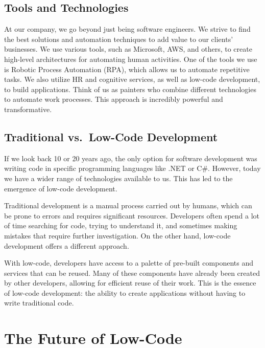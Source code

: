 \subsection{Tools and Technologies}\label{tools-and-technologies}

At our company, we go beyond just being software engineers. We strive to
find the best solutions and automation techniques to add value to our
clients' businesses. We use various tools, such as Microsoft, AWS, and
others, to create high-level architectures for automating human
activities. One of the tools we use is Robotic Process Automation (RPA),
which allows us to automate repetitive tasks. We also utilize HR and
cognitive services, as well as low-code development, to build
applications. Think of us as painters who combine different technologies
to automate work processes. This approach is incredibly powerful and
transformative.

\subsection{Traditional vs.~Low-Code
    Development}\label{traditional-vs.-low-code-development}

If we look back 10 or 20 years ago, the only option for software
development was writing code in specific programming languages like .NET
or C\#. However, today we have a wider range of technologies
available to us. This has led to the emergence of low-code development.

Traditional development is a manual process carried out by humans, which
can be prone to errors and requires significant resources. Developers
often spend a lot of time searching for code, trying to understand it,
and sometimes making mistakes that require further investigation. On the
other hand, low-code development offers a different approach.

With low-code, developers have access to a palette of pre-built
components and services that can be reused. Many of these components
have already been created by other developers, allowing for efficient
reuse of their work. This is the essence of low-code development: the
ability to create applications without having to write traditional code.

\section{The Future of Low-Code}\label{the-future-of-low-code}

